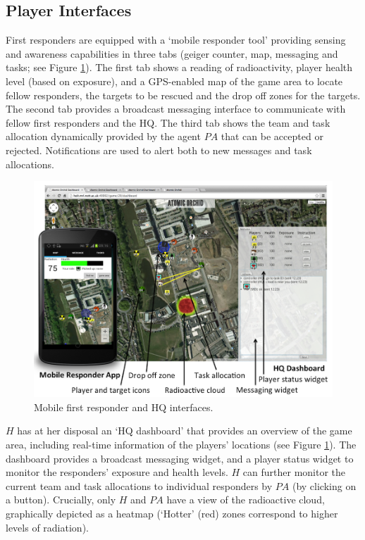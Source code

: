 \subsection{Player Interfaces}
\noindent First responders are equipped with a `mobile responder tool' providing sensing and awareness capabilities in three tabs (geiger cou\-nter, map, messaging and tasks; see Figure \ref{fig:ui}). The first tab shows a reading of radioactivity, player health level (based on exposure), and a GPS-enabled map of the game area to locate fellow responders, the targets to be rescued and the drop off zones for the targets. The second tab provides a broadcast messaging interface to communicate with fellow first responders and the HQ. The third tab shows the team and task allocation dynamically provided by the agent $PA$ that can be accepted or rejected. Notifications are used to alert both to new messages and task allocations.

\begin{figure}[htbp]
\includegraphics{UI.png}
\caption{Mobile first responder and HQ interfaces.}\label{fig:ui}
\end{figure}

$H$ has at her disposal an `HQ dashboard' that provides an over\-view of the game area, including real-time information of the players' locations (see Figure \ref{fig:ui}). The dashboard provides a broadcast messaging widget, and a player status widget to monitor the responders' exposure and health levels. $H$ can further monitor the current team and task allocations to individual responders by $PA$ (by clicking on a button). Crucially, only $H$ and $PA$ have a view of the radioactive cloud, graphically depicted as a heatmap (`Hotter' (red) zones correspond to higher levels of radiation).

